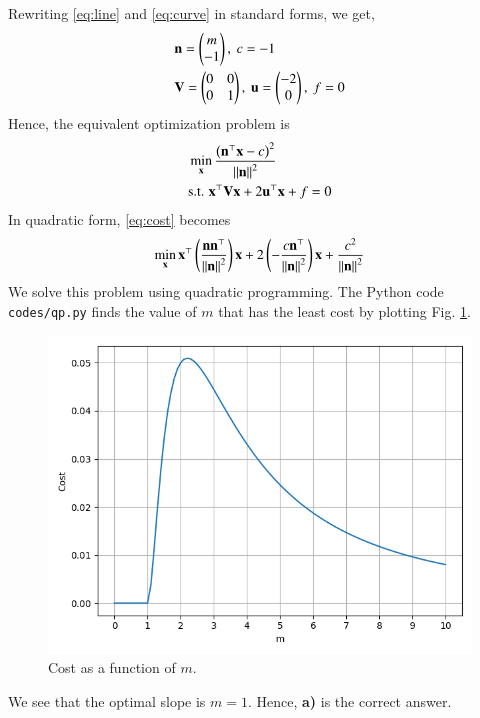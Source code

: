 \documentclass[journal,12pt,twocolumn]{IEEEtran}
\begin{document}
\begin{enumerate}
    \solution Rewriting \eqref{eq:line} and \eqref{eq:curve} in standard forms,
    we get,
    \begin{align}
        &\mathbf{n} = \begin{pmatrix}m\\-1\end{pmatrix},\ c = -1 \label{eq:line-params} \\
        &\mathbf{V} = \begin{pmatrix}0&0\\0&1\end{pmatrix},\ \mathbf{u} = \begin{pmatrix}-2\\0\end{pmatrix},\ f = 0 \label{eq:curve-params}
    \end{align}
    Hence, the equivalent optimization problem is
    \begin{align}
        &\min_{\mathbf{x}} \frac{\left(\mathbf{n}^\top\mathbf{x}-c\right)^2}{\left\lVert\mathbf{n}\right\rVert^2} \label{eq:cost} \\
        &\textrm{s.t. } \mathbf{x}^\top\mathbf{Vx} + 2\mathbf{u}^\top\mathbf{x} + f = 0 \label{eq:constr}
    \end{align}
    In quadratic form, \eqref{eq:cost} becomes
    \begin{align}
        \min_{\mathbf{x}} \mathbf{x}^\top\left(\frac{\mathbf{nn}^\top}{\left\lVert\mathbf{n}\right\rVert^2}\right)\mathbf{x} + 2\left(-\frac{c\mathbf{n}^\top}{\left\lVert\mathbf{n}\right\rVert^2}\right)\mathbf{x} + \frac{c^2}{\left\lVert\mathbf{n}\right\rVert^2}
    \end{align}
    We solve this problem using quadratic programming. The Python code 
    \texttt{codes/qp.py} finds the value of $m$ that has the least cost
    by plotting Fig. \ref{fig:qp}. 
    \begin{figure}[!ht]
        \centering
        \includegraphics[width=\columnwidth]{figs/qp.png}
        \caption{Cost as a function of $m$.}
        \label{fig:qp}
    \end{figure}
    We see that the optimal slope is $m = 1$. Hence, \textbf{a)} is the
    correct answer.
\end{enumerate}
\end{document}

